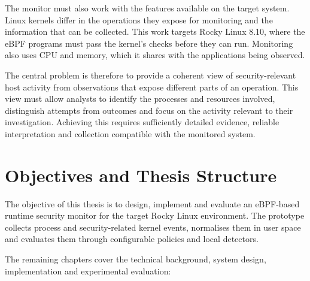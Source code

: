   The monitor must also work with the features available on the target system.
  Linux kernels differ in the operations they expose for monitoring and the
  information that can be collected. This work targets Rocky Linux 8.10, where
  the eBPF programs must pass the kernel's checks before they can run.
  Monitoring also uses CPU and memory, which it shares with the applications
  being observed.

  The central problem is therefore to provide a coherent view of
  security-relevant host activity from observations that expose different
  parts of an operation. This view must allow analysts to identify the
  processes and resources involved, distinguish attempts from outcomes and
  focus on the activity relevant to their investigation. Achieving this
  requires sufficiently detailed evidence, reliable interpretation and
  collection compatible with the monitored system.

\section{Objectives and Thesis Structure}
\label{sec:introduction-objectives}

The objective of this thesis is to design, implement and evaluate an eBPF-based runtime security monitor for the target Rocky Linux environment. The prototype collects process and security-related kernel events, normalises them in user space and evaluates them through configurable policies and local detectors.

The remaining chapters cover the technical background, system design, implementation and experimental evaluation:

